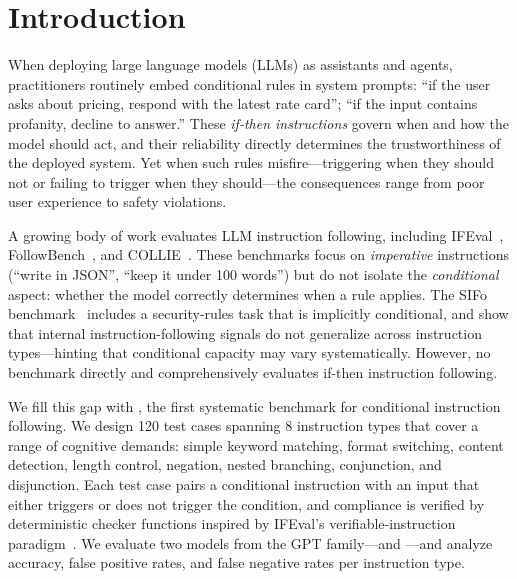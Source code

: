 \section{Introduction}
\label{sec:intro}

When deploying large language models (LLMs) as assistants and agents, practitioners routinely embed conditional rules in system prompts: ``if the user asks about pricing, respond with the latest rate card''; ``if the input contains profanity, decline to answer.'' These \emph{if-then instructions} govern when and how the model should act, and their reliability directly determines the trustworthiness of the deployed system. Yet when such rules misfire---triggering when they should not or failing to trigger when they should---the consequences range from poor user experience to safety violations.

A growing body of work evaluates LLM instruction following, including IFEval~\citep{zhou2023ifeval}, FollowBench~\citep{jiang2023followbench}, and COLLIE~\citep{yao2023collie}. These benchmarks focus on \emph{imperative} instructions (``write in JSON'', ``keep it under 100 words'') but do not isolate the \emph{conditional} aspect: whether the model correctly determines when a rule applies. The SIFo benchmark~\citep{chen2024sifo} includes a security-rules task that is implicitly conditional, and \citet{heo2024llms} show that internal instruction-following signals do not generalize across instruction types---hinting that conditional capacity may vary systematically. However, no benchmark directly and comprehensively evaluates if-then instruction following.

We fill this gap with \benchname, the first systematic benchmark for conditional instruction following. We design 120 test cases spanning 8 instruction types that cover a range of cognitive demands: simple keyword matching, format switching, content detection, length control, negation, nested branching, conjunction, and disjunction. Each test case pairs a conditional instruction with an input that either triggers or does not trigger the condition, and compliance is verified by deterministic checker functions inspired by IFEval's verifiable-instruction paradigm~\citep{zhou2023ifeval}. We evaluate two models from the GPT family---\gptlarge and \gptsmall---and analyze accuracy, false positive rates, and false negative rates per instruction type.

